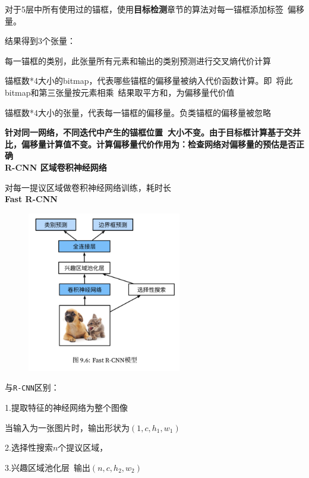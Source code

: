 \documentclass[UTF8]{ctexart}
\begin{document}
  \quad \quad 对于5层中所有使用过的锚框，使用\textbf{目标检测}章节的算法对每一锚框添加标签\ 偏移量。
  
  \quad \quad 结果得到3个张量：
  
  \quad \quad \quad 每一锚框的类别，此张量所有元素和输出的类别预测进行交叉熵代价计算
  
  \quad \quad \quad 锚框数*4大小的bitmap，代表哪些锚框的偏移量被纳入代价函数计算。即\ 将此bitmap和第三张量按元素相乘\ 结果取平方和，为偏移量代价值
  
  \quad \quad \quad 锚框数*4大小的张量，代表每一锚框的偏移量。负类锚框的偏移量被忽略
  
  \quad \quad \quad \textbf{针对同一网络，不同迭代中产生的锚框位置\ 大小不变。由于目标框计算基于交并比，偏移量计算值不变。计算偏移量代价作用为：检查网络对偏移量的预估是否正确}\\
\textbf{R-CNN 区域卷积神经网络}

  对每一提议区域做卷积神经网络训练，耗时长\\
\textbf{Fast R-CNN}

  \begin{figure}[H] %
    \centering %
    \includegraphics[width=0.6\textwidth]{note_images/Fast_R-CNN.png} %
  \end{figure}

  与\texttt{R-CNN}区别：

  \quad 1.提取特征的神经网络为整个图像

  \quad \quad 当输入为一张图片时，输出形状为$(1, c, h_1, w_1)$

  \quad 2.选择性搜索$n$个提议区域，

  \quad 3.兴趣区域池化层\ 输出$(n, c, h_2, w_2)$
\end{document}
